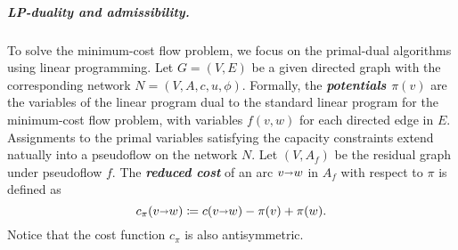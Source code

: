\documentclass[a4paper,UKenglish]{socg-lipics-v2018}
\makeatletter
\def\note#1{\textcolor{red}{{#1}}}
\def\fsupply{\phi}
\def\arcto{\mathord\shortrightarrow}
\def\arc#1#2{#1\arcto#2}
\theoremstyle{plain}
\numberwithin{figure}{section}
\renewcommand{\paragraph}{\subparagraph}
\def\EMPH#1{\textbf{\emph{\boldmath #1}}}
\def\n@te#1{\textsf{\boldmath \textbf{$\langle\!\langle$#1$\rangle\!\rangle$}}\leavevmode}
\def\note#1{\textcolor{red}{\n@te{#1}}}
\makeatother
\begin{document}
%
%
%
%


\paragraph{LP-duality and admissibility.}
To solve the minimum-cost flow problem, we focus on the primal-dual algorithms using linear programming.
Let $G = (V,E)$ be a given directed graph with the corresponding network $N = (V,A,c,u,\fsupply)$.
Formally, the
\EMPH{potentials $\pi(v)$} are the variables of the linear program dual to the standard linear program for the minimum-cost flow problem, with variables $f(v,w)$ for each directed edge in $E$.
Assignments to the primal variables satisfying the capacity constraints extend natually into a pseudoflow on the network $N$.
Let $(V,A_f)$ be the residual graph under pseudoflow $f$.
The \EMPH{reduced cost} of an arc $\arc vw$ in $A_f$ with respect to $\pi$ is defined as
\[
\EMPH{$c_\pi(\arc vw)$} \coloneqq c(\arc vw) - \pi(v) + \pi(w).
\]
Notice that the cost function $c_\pi$ is also antisymmetric.
\end{document}
